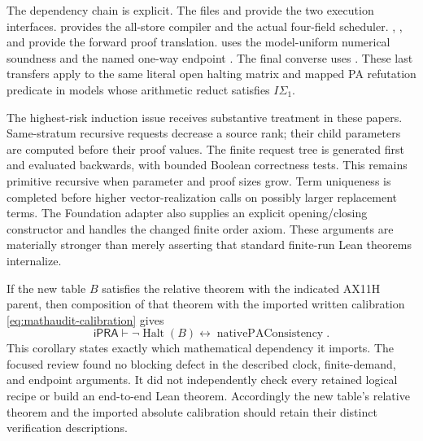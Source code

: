 The dependency chain is explicit.  The files
\texttt{} and
\texttt{}
provide the two execution interfaces.
\texttt{}
provides the all-store compiler and the actual four-field scheduler.
\texttt{},
\texttt{}, and
\texttt{}
provide the forward proof translation.
\texttt{}
uses the model-uniform numerical soundness and the named one-way endpoint
\texttt{}.
The final converse uses
\texttt{}.
These last transfers apply to the same literal open halting matrix and
mapped PA refutation predicate in models whose arithmetic reduct
satisfies $I\Sigma_1$.

The highest-risk induction issue receives substantive treatment in these
papers.  Same-stratum recursive requests decrease a source rank; their
child parameters are computed before their proof values.  The finite
request tree is generated first and evaluated backwards, with bounded
Boolean correctness tests.  This remains primitive recursive when
parameter and proof sizes grow.  Term uniqueness is completed before
higher vector-realization calls on possibly larger replacement terms.
The Foundation adapter also supplies an explicit opening/closing
constructor and handles the changed finite order axiom.  These arguments
are materially stronger than merely asserting that standard finite-run
Lean theorems internalize.

If the new table $B$ satisfies the relative theorem with the indicated
AX11H parent, then composition of that theorem with the imported written
calibration \eqref{eq:mathaudit-calibration} gives
\[
 \mathsf{iPRA}\vdash
 \neg\operatorname{Halt}(B)\longleftrightarrow
 \operatorname{nativePAConsistency}.
\]
This corollary states exactly which mathematical dependency it imports.
The focused review found no blocking defect in the described clock,
finite-demand, and endpoint arguments.  It did not independently check
every retained logical recipe or build an end-to-end Lean theorem.
Accordingly the new table's relative theorem and the imported absolute
calibration should retain their distinct verification descriptions.
